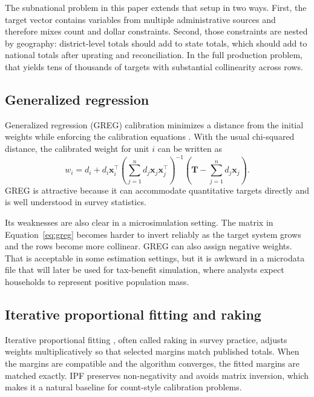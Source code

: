 The subnational problem in this paper extends that setup in two ways. First, the target vector
contains variables from multiple administrative sources and therefore mixes count and dollar
constraints. Second, those constraints are nested by geography: district-level totals should add to
state totals, which should add to national totals after uprating and reconciliation. In the full
production problem, that yields tens of thousands of targets with substantial collinearity across
rows.

\subsection{Generalized regression}

Generalized regression (GREG) calibration minimizes a distance from the initial weights while
enforcing the calibration equations \citep{deville1992, sarndal2007}. With the usual chi-squared
distance, the calibrated weight for unit $i$ can be written as
\begin{equation}
    w_i = d_i + d_i \mathbf{x}_i^\top
    \left(\sum_{j=1}^{n} d_j \mathbf{x}_j \mathbf{x}_j^\top\right)^{-1}
    \left(\mathbf{T} - \sum_{j=1}^{n} d_j \mathbf{x}_j\right).
    \label{eq:greg}
\end{equation}
GREG is attractive because it can accommodate quantitative targets directly and is well understood
in survey statistics.

Its weaknesses are also clear in a microsimulation setting. The matrix in
Equation~\ref{eq:greg} becomes harder to invert reliably as the target system grows and the rows
become more collinear. GREG can also assign negative weights. That is acceptable in some
estimation settings, but it is awkward in a microdata file that will later be used for tax-benefit
simulation, where analysts expect households to represent positive population mass.

\subsection{Iterative proportional fitting and raking}

Iterative proportional fitting \citep[IPF;][]{deming1940, ireland1968}, often called raking in
survey practice, adjusts weights multiplicatively so that selected margins match published totals.
When the margins are compatible and the algorithm converges, the fitted margins are matched
exactly. IPF preserves non-negativity and avoids matrix inversion, which makes it a natural
baseline for count-style calibration problems.

